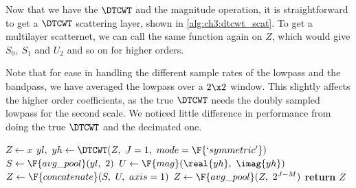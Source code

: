 Now that we have the $\DTCWT$ and the magnitude operation, it is straightforward
to get a $\DTCWT$ scattering layer, shown in \autoref{alg:ch3:dtcwt_scat}. To
get a multilayer scatternet, we can call the same function again on $Z$, which
would give $S_0,\ S_1$ and $U_2$ and so on for higher orders. 

Note that for ease in handling the different sample rates of the lowpass and the
bandpass, we have averaged the lowpass over a $2\x 2$ window. This slightly
affects the higher order coefficients, as the true $\DTCWT$ needs the doubly
sampled lowpass for the second scale. We noticed little difference in
performance from doing the true $\DTCWT$ and the decimated one.

\begin{algorithm}[tb]
  \label{alg:ch3:dtcwt_scat}
\begin{algorithmic}[1]
\State $Z \gets x$
  \State $yl,\ yh \gets \DTCWT(Z,\ J=1,\ mode=\F{`symmetric'})$
  \State $S \gets \F{avg\_pool}(yl,\ 2)$
  \State $U \gets \F{mag}(\real{yh},\ \imag{yh})$ 
  \State $Z \gets \F{concatenate}(S,\ U,\ axis=1)$ 
\EndFor
{}
\State $Z \gets \F{avg\_pool}(Z,\ 2^{J-M})$
\EndIf
\State \textbf{return} $Z$
\EndFunction
\end{algorithmic}
\end{algorithm}
